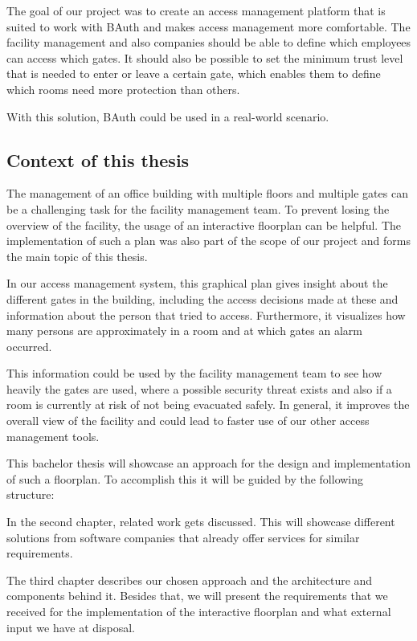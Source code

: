 The goal of our project was to create an access management platform that is suited to work with BAuth and makes access management more comfortable. The facility management and also companies should be able to define which employees can access which gates. It should also be possible to set the minimum trust level that is needed to enter or leave a certain gate, which enables them to define which rooms need more protection than others.

With this solution, BAuth could be used in a real-world scenario.

\subsection{Context of this thesis}
\label{Context of this thesis}


The management of an office building with multiple floors and multiple gates can be a challenging task for the facility management team. To prevent losing the overview of the facility, the usage of an interactive floorplan can be helpful. The implementation of such a plan was also part of the scope of our project and forms the main topic of this thesis.

In our access management system, this graphical plan gives insight about the different gates in the building, including the access decisions made at these and information about the person that tried to access. Furthermore, it visualizes how many persons are approximately in a room and at which gates an alarm occurred. 

This information could be used by the facility management team to see how heavily the gates are used, where a possible security threat exists and also if a room is currently at risk of not being evacuated safely. 
In general, it improves the overall view of the facility and could lead to faster use of our other access management tools.

This bachelor thesis will showcase an approach for the design and implementation of such a floorplan. To accomplish this it will be guided by the following structure:

In the second chapter, related work gets discussed. This will showcase different solutions from software companies that already offer services for similar requirements.

The third chapter describes our chosen approach and the architecture and components behind it. Besides that, we will present the requirements that we received for the implementation of the interactive floorplan and what external input we have at disposal.

